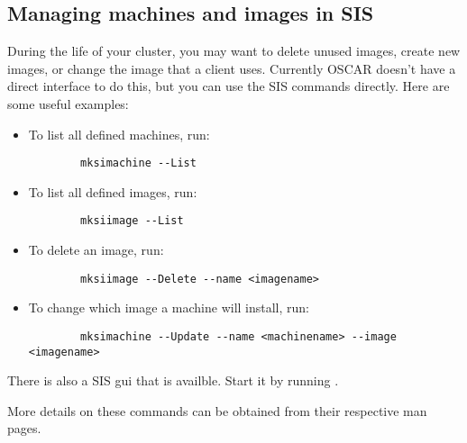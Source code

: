 %
%
%

\subsection{Managing machines and images in SIS}
\label{app:troubleshooting-machines-images}

During the life of your cluster, you may want to delete unused
images, create new images, or change the image that a
client uses.  Currently OSCAR doesn't have a direct interface to do
this, but you can use the SIS commands directly. Here are some useful
examples:

\begin{itemize}
\item To list all defined machines, run:
\begin{verbatim}
        mksimachine --List
\end{verbatim}
\item To list all defined images, run:
\begin{verbatim}
        mksiimage --List
\end{verbatim}
\item To delete an image, run:
\begin{verbatim}
        mksiimage --Delete --name <imagename>
\end{verbatim}
\item To change which image a machine will install, run:
\begin{verbatim}
        mksimachine --Update --name <machinename> --image <imagename>
\end{verbatim}
\end{itemize}

There is also a SIS gui that is availble. Start it by running
. 

More details on these commands can be obtained from their respective
man pages.

